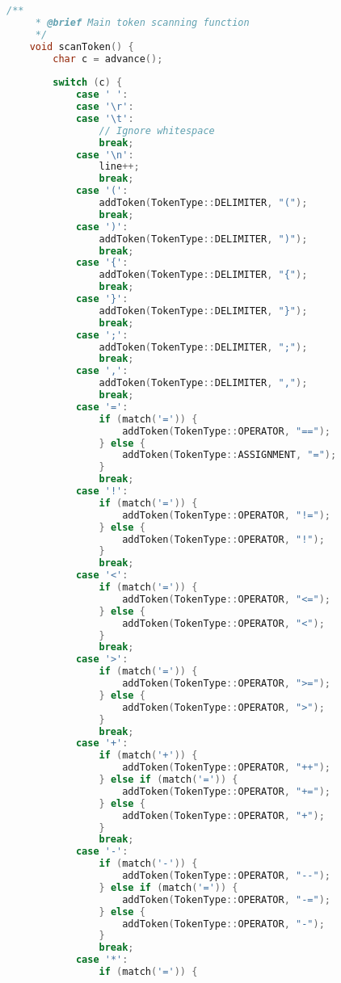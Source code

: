 \documentclass[12pt,a4paper]{article}
\begin{document}
\begin{lstlisting}[language=C++, caption=Lexical Analyzer Implementation]
    /**
     * @brief Main token scanning function
     */
    void scanToken() {
        char c = advance();
        
        switch (c) {
            case ' ':
            case '\r':
            case '\t':
                // Ignore whitespace
                break;
            case '\n':
                line++;
                break;
            case '(':
                addToken(TokenType::DELIMITER, "(");
                break;
            case ')':
                addToken(TokenType::DELIMITER, ")");
                break;
            case '{':
                addToken(TokenType::DELIMITER, "{");
                break;
            case '}':
                addToken(TokenType::DELIMITER, "}");
                break;
            case ';':
                addToken(TokenType::DELIMITER, ";");
                break;
            case ',':
                addToken(TokenType::DELIMITER, ",");
                break;
            case '=':
                if (match('=')) {
                    addToken(TokenType::OPERATOR, "==");
                } else {
                    addToken(TokenType::ASSIGNMENT, "=");
                }
                break;
            case '!':
                if (match('=')) {
                    addToken(TokenType::OPERATOR, "!=");
                } else {
                    addToken(TokenType::OPERATOR, "!");
                }
                break;
            case '<':
                if (match('=')) {
                    addToken(TokenType::OPERATOR, "<=");
                } else {
                    addToken(TokenType::OPERATOR, "<");
                }
                break;
            case '>':
                if (match('=')) {
                    addToken(TokenType::OPERATOR, ">=");
                } else {
                    addToken(TokenType::OPERATOR, ">");
                }
                break;
            case '+':
                if (match('+')) {
                    addToken(TokenType::OPERATOR, "++");
                } else if (match('=')) {
                    addToken(TokenType::OPERATOR, "+=");
                } else {
                    addToken(TokenType::OPERATOR, "+");
                }
                break;
            case '-':
                if (match('-')) {
                    addToken(TokenType::OPERATOR, "--");
                } else if (match('=')) {
                    addToken(TokenType::OPERATOR, "-=");
                } else {
                    addToken(TokenType::OPERATOR, "-");
                }
                break;
            case '*':
                if (match('=')) {

\end{lstlisting}
\end{document}
